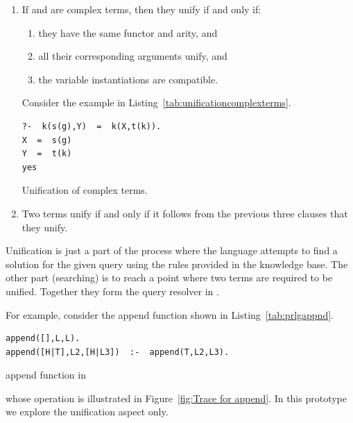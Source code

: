 \documentclass[thesis-solanki.tex]{subfiles}
\begin{document}
\begin{enumerate}
\item If  and  are complex terms, then they unify if and only if:

\begin{enumerate}
\item they have the same functor and arity, and

\item all their corresponding arguments unify, and

\item the variable instantiations are compatible.
\end{enumerate}
Consider the example in Listing~\ref{tab:unificationcomplexterms}.
\par
\begin{code-list}[H]
\begin{verbatim}
?-  k(s(g),Y)  =  k(X,t(k)).
X  =  s(g)
Y  =  t(k)
yes
\end{verbatim}
\caption{Unification of complex terms.}
\label{tab:unificationcomplexterms}
\end{code-list}



\item Two terms unify if and only if it follows from the previous three clauses that they unify.
\end{enumerate}

Unification is just a part of the process where the language
attempts to find a solution for the given query using the rules provided
in the knowledge base.
The other part (searching) is to reach a point where two terms are required to be unified.
Together they form the query resolver in .

For example, consider the append function shown in Listing~\ref{tab:prlgappnd}.

\begin{code-list}[H]
\begin{verbatim}
append([],L,L).
append([H|T],L2,[H|L3])  :-  append(T,L2,L3).
\end{verbatim}
\caption{append function in }
\label{tab:prlgappnd}
\end{code-list}
%
whose operation is illustrated in Figure~\ref{fig:Trace for append}.
In this prototype we explore the unification aspect only.
\end{document}
